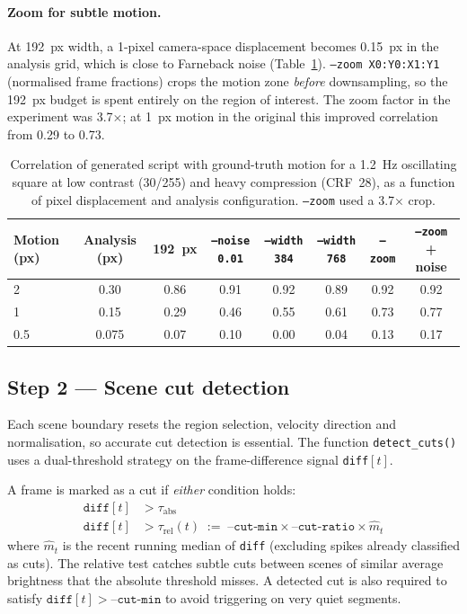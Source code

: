 \documentclass[12pt,a4paper]{article}
\begin{document}
\paragraph{Zoom for subtle motion.}
At 192~px width, a 1-pixel camera-space displacement becomes 0.15~px in the
analysis grid, which is close to Farneback noise (Table~\ref{tab:zoom}).
\texttt{--zoom X0:Y0:X1:Y1} (normalised frame fractions) crops the motion zone
\emph{before} downsampling, so the 192~px budget is spent entirely on the
region of interest. The zoom factor in the experiment was 3.7$\times$; at 1~px
motion in the original this improved correlation from 0.29 to 0.73.

\begin{table}[H]
\centering
\caption{Correlation of generated script with ground-truth motion for a
1.2~Hz oscillating square at low contrast (30/255) and heavy compression
(CRF~28), as a function of pixel displacement and analysis configuration.
\texttt{--zoom} used a 3.7$\times$ crop.}
\label{tab:zoom}
\small
\begin{tabular}{@{}lccccccc@{}}
\toprule
Motion (px) & Analysis (px) & 192~px & \texttt{--noise 0.01} &
  \texttt{--width 384} & \texttt{--width 768} & \texttt{--zoom} &
  \texttt{--zoom} + noise \\
\midrule
2   & 0.30 & 0.86 & 0.91 & 0.92 & 0.89 & 0.92 & 0.92 \\
1   & 0.15 & 0.29 & 0.46 & 0.55 & 0.61 & 0.73 & 0.77 \\
0.5 & 0.075 & 0.07 & 0.10 & 0.00 & 0.04 & 0.13 & 0.17 \\
\bottomrule
\end{tabular}
\end{table}

\subsection{Step 2 --- Scene cut detection}
\label{sec:cuts}

Each scene boundary resets the region selection, velocity direction and
normalisation, so accurate cut detection is essential. The function
\texttt{detect\_cuts()} uses a dual-threshold strategy on the
frame-difference signal \texttt{diff}$[t]$.

A frame is marked as a cut if \emph{either} condition holds:
\begin{align}
  \texttt{diff}[t] &> \tau_\mathrm{abs} \tag{absolute} \\
  \texttt{diff}[t] &> \tau_\mathrm{rel}(t)
    \;:=\; \texttt{--cut-min} \times \texttt{--cut-ratio}
    \times \hat{m}_t \tag{relative}
\end{align}
where $\hat{m}_t$ is the recent running median of \texttt{diff} (excluding
spikes already classified as cuts). The relative test catches subtle cuts
between scenes of similar average brightness that the absolute threshold
misses. A detected cut is also required to satisfy
$\texttt{diff}[t] > \texttt{--cut-min}$ to avoid triggering on very quiet
segments.
\end{document}
